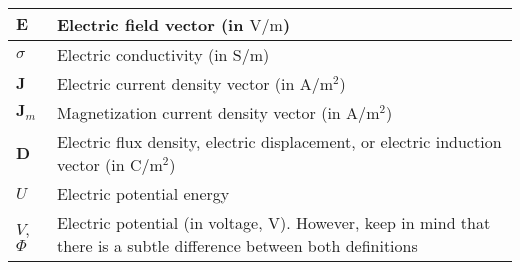 \begin{xltabular}{\textwidth}{XX}
	\(\mathbf{E}\)                                                                                                                           & Electric field vector (in \(\si{\volt\per\meter}\))                                                                                                                                      \\ \hline
	\(\sigma\)                                                                                                                               & Electric conductivity (in \(\si{\siemens\per\meter}\))                                                                                                                                   \\ \hline
	\(\mathbf{J}\)                                                                                                                           & Electric current density vector (in \(\si{\ampere\per\square\meter}\))                                                                                                                   \\ \hline
	\(\mathbf{J}_m\)\cite{chengFieldWaveElectromagnetics1989}                                                                                & Magnetization current density vector (in \(\si{\ampere\per\meter\squared}\))                                                                                                             \\ \hline
	\(\mathbf{D}\)                                                                                                                           & Electric flux density, electric displacement, or electric induction vector (in \(\si{\coulomb\per\meter\squared}\))                                                                      \\ \hline
	\(U\)                                                                                                                                    & Electric potential energy                                                                                                                                                                \\ \hline
	\(V\)\cite{wiki:electric-potential,chengFieldWaveElectromagnetics1989}, \(\Phi\)\cite{ramoFieldsWavesCommunication1994}                  & Electric potential (in voltage, \(\si{\volt}\)). However, keep in mind that there is a subtle difference between both definitions \cite{stackexchange:electric-potential-vs-voltage}     \\ \hline

\end{xltabular}
